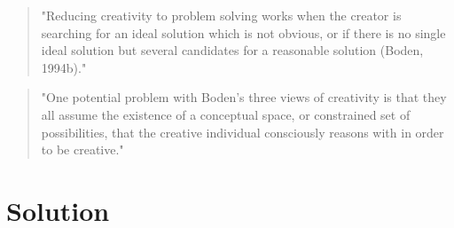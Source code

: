 \begin{quote}
"Reducing creativity to problem solving works when the creator is searching for an ideal solution which is not obvious, or if there is no single ideal solution but several candidates for a reasonable solution (Boden, 1994b)." \citep{Jordanous2012}
\end{quote}

\begin{quote}
"One potential problem with Boden’s three views of creativity is that they all assume the existence of a conceptual space, or constrained set of possibilities, that the creative individual consciously reasons with in order to be creative." \citep{Jordanous2012}
\end{quote}

\section{Solution}


